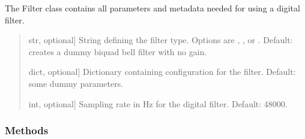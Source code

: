 \documentclass[letterpaper,10pt,english]{sphinxmanual}
\begin{document}
\begin{fulllineitems}
\begin{fulllineitems}
\label{\detokenize{classes:dsptools.classes.filter_class.Filter.__init__}}
\pysigstartsignatures
{}
\pysigstopsignatures
\sphinxAtStartPar
The Filter class contains all parameters and metadata needed for
using a digital filter.
\begin{quote}\begin{description}
\begin{description}
\sphinxlineitem{\sphinxstylestrong{filter\_type}}{[}str, optional{]}
\sphinxAtStartPar
String defining the filter type. Options are , ,
 or . Default: creates a dummy biquad bell filter
with no gain.

\sphinxlineitem{\sphinxstylestrong{filter\_configuration}}{[}dict, optional{]}
\sphinxAtStartPar
Dictionary containing configuration for the filter.
Default: some dummy parameters.

\sphinxlineitem{\sphinxstylestrong{sampling\_rate\_hz}}{[}int, optional{]}
\sphinxAtStartPar
Sampling rate in Hz for the digital filter. Default: 48000.

\end{description}

\end{description}\end{quote}
\subsubsection*{Methods}



\end{fulllineitems}
\end{fulllineitems}
\end{document}
